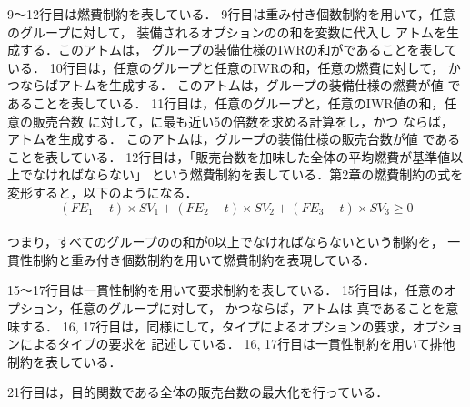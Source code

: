 9〜12行目は燃費制約を表している．
9行目は重み付き個数制約を用いて，任意のグループに対して，
装備されるオプションのの和を変数に代入し
アトムを生成する．このアトムは，
グループの装備仕様のIWRの和がであることを表している．
%
10行目は，任意のグループと任意のIWRの和，任意の燃費に対して，
かつならばアトムを生成する．
このアトムは，グループの装備仕様の燃費が値
であることを表している．
%
11行目は，任意のグループと，任意のIWR値の和，任意の販売台数
に対して，に最も近い5の倍数を求める計算をし，かつ
ならば，アトムを生成する．
このアトムは，グループの装備仕様の販売台数が値
であることを表している．
12行目は，「販売台数を加味した全体の平均燃費が基準値以上でなければならない」
という燃費制約を表している．第2章の燃費制約の式を変形すると，以下のようになる．
\vspace{1em}
\begin{displaymath}
 (FE_{1} - t) \times SV_{1} + (FE_{2} - t) \times SV_{2} + (FE_{3} - t)
 \times SV_{3} \geq 0
\end{displaymath}
\\
つまり，すべてのグループのの和が0以上でなければならないという制約を，
一貫性制約と重み付き個数制約を用いて燃費制約を表現している．




15〜17行目は一貫性制約を用いて要求制約を表している．
15行目は，任意のオプション，任意のグループに対して，
かつならば，アトムは
真であることを意味する．
16, 17行目は，同様にして，タイプによるオプションの要求，オプションによるタイプの要求を
記述している．
16, 17行目は一貫性制約を用いて排他制約を表している．


21行目は，目的関数である全体の販売台数の最大化を行っている．




